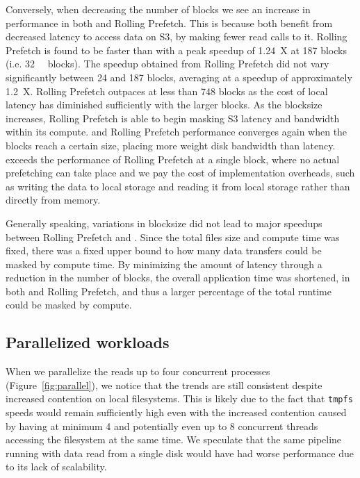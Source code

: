 Conversely, when decreasing the number of blocks we see an increase in performance in both \sfs and Rolling Prefetch. This
is because both benefit from decreased latency to access data on S3, by making fewer read calls to it. Rolling Prefetch is found to be faster than \sfs with a peak speedup of 1.24~X at 187 blocks (i.e. 
\SI{32}{\mebi\byte} blocks). The speedup obtained from Rolling Prefetch did not vary significantly between 24 and
187 blocks, averaging at a speedup of approximately 1.2~X. Rolling Prefetch outpaces \sfs at less than
748 blocks as the cost of local latency has diminished sufficiently with the larger blocks. As the blocksize
increases, Rolling Prefetch is able to begin masking S3 latency and bandwidth within its compute.
\sfs and Rolling Prefetch performance converges again when the blocks reach a certain size, placing more weight disk bandwidth
than latency. \sfs exceeds the performance of Rolling Prefetch at a single block, where no actual prefetching can take
place and we pay the cost of implementation overheads, such as writing the data to local storage 
and reading it from local storage rather than directly from memory.

Generally speaking, variations in blocksize did not lead to major speedups between Rolling Prefetch and \sfs. Since the
total files size and compute time was fixed, there was a fixed upper bound to how many data transfers could
be masked by compute time. By minimizing the amount of latency through a reduction in the number of blocks, the 
overall application time was shortened, in both \sfs and Rolling Prefetch, and thus a larger percentage of the total 
runtime could be masked by compute.

\subsection{Parallelized workloads}
When we parallelize the reads up to four concurrent processes (Figure~\ref{fig:parallel}), we notice that the trends are still consistent
despite increased contention on local filesystems. This is likely due to the fact that \texttt{tmpfs} speeds
would remain sufficiently high even with the increased contention caused by having at minimum 4 and 
potentially even up to 8 concurrent threads accessing the filesystem at the same time. We speculate that the same 
pipeline running with data read from a single disk would have had worse performance
due to its lack of scalability.

